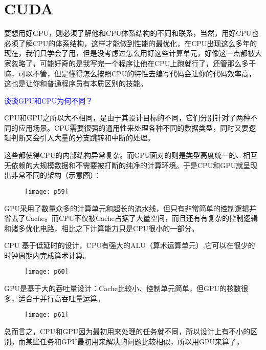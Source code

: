 \documentclass[utf8]{book}
\begin{document}
\section{CUDA}

要想用好GPU，则必须了解他和CPU体系结构的不同和联系，当然，用好CPU也必须了解CPU的体系结构，这样才能做到性能的最优化，在CPU出现这么多年的现在，我们只学会了用，但是没考虑过怎么用好这些计算单元，好像这一点都被大家忽略了，可能好奇的是我写完一个程序让他在CPU上跑就行了，还管那么多干嘛，可以不管，但是懂得怎么按照CPU的特性去编写代码会让你的代码效率高，这也是让你和普通程序员有本质区别的技能。

\textcolor{blue}{谈谈GPU和CPU为何不同？}



CPU和GPU之所以大不相同，是由于其设计目标的不同，它们分别针对了两种不同的应用场景。CPU需要很强的通用性来处理各种不同的数据类型，同时又要逻辑判断又会引入大量的分支跳转和中断的处理。

这些都使得CPU的内部结构异常复杂。而GPU面对的则是类型高度统一的、相互无依赖的大规模数据和不需要被打断的纯净的计算环境。于是CPU和GPU就呈现出非常不同的架构（示意图）：

	\begin{figure}[H]
	\centering
	\texttt{[image: p59]}
	\end{figure}

GPU采用了数量众多的计算单元和超长的流水线，但只有非常简单的控制逻辑并省去了Cache。而CPU不仅被Cache占据了大量空间，而且还有有复杂的控制逻辑和诸多优化电路，相比之下计算能力只是CPU很小的一部分。

CPU 基于低延时的设计，CPU有强大的ALU（算术运算单元）,它可以在很少的时钟周期内完成算术计算。

	\begin{figure}[H]
	\centering
	\texttt{[image: p60]}
	\end{figure}

GPU是基于大的吞吐量设计：Cache比较小、控制单元简单，但GPU的核数很多，适合于并行高吞吐量运算。

	\begin{figure}[H]
	\centering
	\texttt{[image: p61]}
	\end{figure}


总而言之，CPU和GPU因为最初用来处理的任务就不同，所以设计上有不小的区别。而某些任务和GPU最初用来解决的问题比较相似，所以用GPU来算了。
\end{document}
